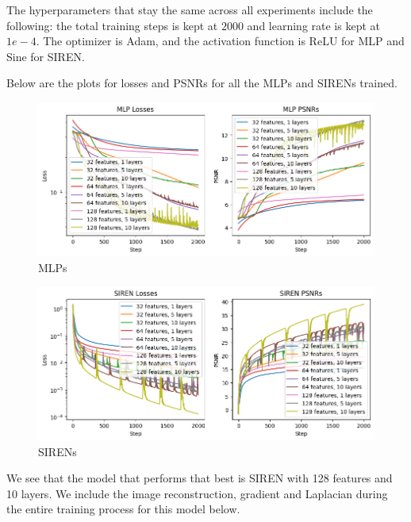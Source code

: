 \documentclass[12pt]{article}
\begin{document}
The hyperparameters that stay the same across all experiments include the following: the total training steps is kept at $2000$ and learning rate is kept at $1e-4$. The optimizer is Adam, and the activation function is ReLU for MLP and Sine for SIREN.

Below are the plots for losses and PSNRs for all the MLPs and SIRENs trained. 
\begin{figure}[h]
    \centering 
    \includegraphics[width=1.0\textwidth]{LOSS_plot.png}
    \caption{MLPs}
\end{figure}
\begin{figure}[H]
    \centering 
    \includegraphics[width=1.0\textwidth]{PSNRs_plot.png}
    \caption{SIRENs}
\end{figure}

We see that the model that performs that best is SIREN with 128 features and 10 layers. We include the image reconstruction, gradient and Laplacian during the entire training process for this model below. 
\end{document}

